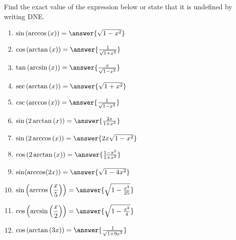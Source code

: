 \documentclass{ximera}
\author{Carl Stitz \and Jeff Zeager \and Bart Snapp \and Matthew Carr}
\begin{document}
\begin{exercise}





Find the exact value of the expression below or state that it is undefined by writing DNE.
 \begin{enumerate}
  \item $\sin \left( \arccos \left( x \right) \right)=\answer{\sqrt{1-x^2}}$ \label{rewritefirst}
  \item $\cos \left( \arctan \left( x \right) \right)=\answer{\frac{1}{\sqrt{1+x^2}}}$ 
  \item $\tan \left( \arcsin \left( x \right) \right)=\answer{\frac{x}{\sqrt{1-x^2}}}$ 
  \item $\sec \left( \arctan \left( x \right) \right)=\answer{\sqrt{1+x^2}}$ 
  \item $\csc \left( \arccos \left( x \right) \right)=\answer{\frac{1}{\sqrt{1-x^2}}}$ 
  \item $\sin \left( 2\arctan \left( x \right) \right)=\answer{\frac{2x}{1+x^2}}$ 
  \item $\sin \left( 2\arccos \left( x \right) \right)=\answer{2x\sqrt{1-x^2}}$ 
  \item $\cos \left( 2\arctan \left( x \right) \right)=\answer{\frac{1-x^2}{1+x^2}}$ 
  \item  $\sin(\arccos(2x))=\answer{\sqrt{1-4x^2}}$
  \item  $\sin\left(\arccos\left(\dfrac{x}{5}\right)\right)=\answer{\sqrt{1-\frac{x^2}{25}}}$
  \item  $\cos\left(\arcsin\left(\dfrac{x}{2}\right)\right)=\answer{\sqrt{1-\frac{x^2}{4}}}$
  \item  $\cos\left(\arctan\left(3x\right)\right)=\answer{\frac{1}{\sqrt{1+9x^2}}}$ 
 \end{enumerate}

\end{exercise}
\end{document}
